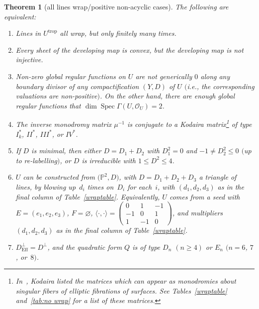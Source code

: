 \documentclass[10pt,a4paper]{amsart}
\numberwithin{equation}{section}
\numberwithin{figure}{section}
\numberwithin{table}{section}
\DeclareMathOperator{\Spec}{Spec}
\DeclareMathOperator{\trop}{trop}
\DeclareMathOperator{\Eff}{Eff}
\let\bb=\mathbb
\let\s=\mathcal
\newtheorem{thm}{Theorem}[section]
\theoremstyle{definition}
\begin{document}
\begin{thm}[all lines wrap/positive non-acyclic cases]\label{all-wrap}
The following are equivalent:
\begin{enumerate}\itemsep=0pt	
 \item[$1.$] {Lines} in $U^{\trop}$ all wrap, but only finitely many times. %
 \item[$2.$] Every sheet of the {developing map} is convex, but the developing map is not injective. %
 \item[$3.$] Non-zero global regular {functions} on $U$ are not generically $0$ along any boundary divisor of any compactification $(Y,D)$ of $U$ $($i.e., the corresponding valuations are non-positive$)$. On the other hand, there are enough global regular functions that $\dim \Spec \Gamma(U,\s{O}_U)=2$.%
 \item[$4.$] The inverse {monodromy matrix} $\mu^{-1}$ is conjugate to a Kodaira matrix\footnote{In~\cite{Kod}, Kodaira listed the matrices which can appear as monodromies about singular fibers of elliptic fibrations of surfaces. See Tables~\ref{wraptable} and~\ref{tab:no wrap} for a list of these matrices.} of type $I_k^*$, $II^*$, $III^*$, or $IV^*$. %
 \item[$5.$] If $D$ is minimal, then either $D=D_1+D_2$ with $D_1^2 = 0$ and $-1\neq D_2^2 \leq 0$ $($up to re-labelling$)$, or $D$ is irreducible with $1\leq D^2 \leq 4$. 	%
 \item[$6.$] $U$ can be constructed from $\big(\bb{P}^2,D\big)$, with $D=D_1+D_2+D_3$ a triangle of lines, by blowing up~$d_i$ times on~$D_i$ for each~$i$, with $(d_1,d_2,d_3)$ as in the final column of Table~{\rm \ref{wraptable}}. Equivalently, $U$ comes from a seed with $E=(e_1,e_2,e_3)$, $F=\varnothing$, $\langle \cdot , \cdot \rangle = 	\left(\begin{smallmatrix}
		0 &1 &-1 \\
	 -1 &0 &1 \\
	 1 &-1 &0
		\end{smallmatrix}\right)$, and multipliers $(d_1,d_2,d_3)$ as in the final column of Table~{\rm \ref{wraptable}}.
\item[$7.$] $D^{\perp}_{\Eff}=D^{\perp}$, and the {quadratic form} $Q$ is of type $D_n$ $(n\geq 4)$ or $E_n$ $(n=6$, $7$, or~$8)$. %
\end{enumerate}
\end{thm}
\end{document}
